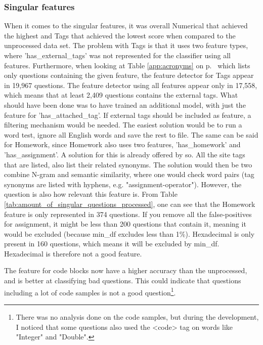 \subsubsection{Singular features}
When it comes to the singular features, it was overall Numerical that achieved the highest and Tags that achieved the lowest score when compared to the unprocessed data set.
The problem with Tags is that it uses two feature types, where 'has\_external\_tags' was not represented for the classifier using all features.
Furthermore, when looking at Table \ref{app:acronyms} on p.~\pageref{app:acronyms} which lists only questions containing the given feature, the feature detector for Tags appear in 19,967 questions.
The feature detector using all features appear only in 17,558, which means that at least 2,409 questions contains the external tags.
What should have been done was to have trained an additional model, with just the feature for 'has\_attached\_tag'.
If external tags should be included as feature, a filtering mechanism would be needed.
The easiest solution would be to run a word test, ignore all English words and save the rest to file.
\vspace{0.5em}\newline
The same can be said for Homework, since Homework also uses two features, 'has\_homework' and 'has\_assignment'.
A solution for this is already offered by \gls{so}.
All the site tags that are listed, also list their related synonyms.
The solution would then be two combine N-gram and semantic similarity, where one would check word pairs (tag synonyms are listed with hyphens, e.g. "assignment-operator").
However, the question is also how relevant this feature is. 
From Table \ref{tab:amount_of_singular_questions_processed}, one can see that the Homework feature is only represented in 374 questions.
If you remove all the false-positives for assignment, it might be less than 200 questions that contain it, meaning it would be excluded (because min\_df excludes less than 1\%).
\vspace{0.5em}\newline
Hexadecimal is only present in 160 questions, which means it will be excluded by min\_df. 
Hexadecimal is therefore not a good feature. 
\vspace{0.5em}\newline


The feature for code blocks now have a higher accuracy than the unprocessed, and is better at classifying bad questions. 
This could indicate that questions including a lot of code samples is not a good question\footnote{
	There was no analysis done on the code samples, but during the development, I noticed that some questions also used the <code> tag on words like "Integer" and "Double".
}.

